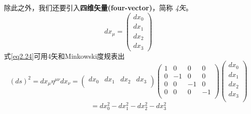 除此之外，我们还要引入{\bf{四维矢量(four-vector)}}，简称
{\it{4矢}}。%
\begin{equation}\label{2.25}
  dx_\mu =\left(\begin{array}{c}
            dx_0 \\
            dx_1 \\
            dx_2 \\
            dx_3
          \end{array}\right)
\end{equation}
式\ref{eq2.24}可用4矢和Minkowski度规表出
\[
  (ds)^2=dx_\mu \eta^{\mu\nu} dx_\nu
  =\left(
     \begin{array}{cccc}
       dx_0 & dx_1 & dx_2 & dx_3 \\
     \end{array}
   \right)
   \!\!\!
   \left(
     \begin{array}{cccc}
       1 & 0 & 0 & 0 \\
       0 & -1 & 0 & 0 \\
        0 & 0 & -1 & 0 \\
        0 & 0 & 0  & -1\\
     \end{array}
   \right)
   \!\!\!
   \left(
     \begin{array}{c}
       dx_0 \\
        dx_1 \\
       dx_2 \\
        dx_3\\
     \end{array}
   \right)
   \]
\begin{equation}\label{eq2.26}
   =dx_0^2-dx_1^2-dx_2^2-dx_3^2
\end{equation}

